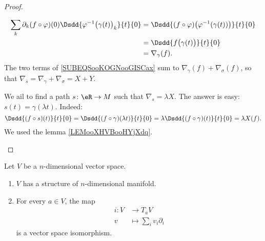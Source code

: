 \begin{proof}
\begin{subproof}
\begin{subequations}
			\begin{align}
				\sum_k\partial_k(f\circ \varphi)(0)\Dsdd{ \varphi^{-1}\big( \gamma(t) \big)_k }{t}{0} & =\Dsdd{ (f\circ\varphi)\big( \varphi^{-1}(\gamma(t)) \big) }{t}{0} \\
				                                                                                      & =\Dsdd{ f\big( \gamma(t) \big) }{t}{0}                             \\
				                                                                                      & =\nabla_{\gamma}(f).
			\end{align}
		\end{subequations}
		The two terms of \eqref{SUBEQSooKOGNooGISCax} sum to \( \nabla_{\gamma}(f)+\nabla_{\sigma}(f)\), so that \( \nabla_s=\nabla_{\gamma}+\nabla_{\sigma}=X+Y\).

		\spitem[Product]

		We ail to find a path \( s\colon \eR\to M\) such that \( \nabla_s=\lambda X\). The answer is easy: \( s(t)=\gamma(\lambda t)\). Indeed:
		\begin{equation}
			\Dsdd{ (f\circ s)(t) }{t}{0}=\Dsdd{ (f\circ \gamma)(\lambda t) }{t}{0}=\lambda \Dsdd{ (f\circ \gamma)(t) }{t}{0}=\lambda X(f).
		\end{equation}
		We used the lemma \ref{LEMooXHVBooHYjXdq}.

		\spitem[Dimension]

	\end{subproof}
\end{proof}

\begin{proposition}     \label{PROPooJVSQooGvNqIx}
	Let \( V\) be a \( n\)-dimensional vector space.
	\begin{enumerate}
		\item
		      \( V\) has a structure of \( n\)-dimensional manifold.
		\item
		      For every \( a\in V\), the map
		      \begin{equation}
			      \begin{aligned}
				      i\colon V & \to T_aV                    \\
				      v         & \mapsto \sum_iv_i\partial_i
			      \end{aligned}
		      \end{equation}
		      is a vector space isomorphism.
	\end{enumerate}
\end{proposition}


